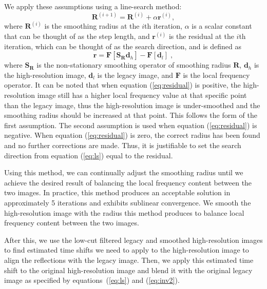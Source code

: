 We apply these assumptions using a line-search method:
    \begin{equation}
        \label{eq:linesearch}
        \mathbf{R}^{(i+1)} = \mathbf{R}^{(i)}+ \alpha \mathbf{r}^{(i)},
    \end{equation}
where $\mathbf{R}^{(i)}$ is the smoothing radius at the $i$th iteration, $\alpha$ is a scalar constant that can be thought of as the step length, and $\mathbf{r}^{(i)}$ is the residual at the $i$th iteration, which can be thought of as the search direction, and is defined as
    \begin{equation}
        \label{eq:residual}
        \mathbf{r} = \mathbf{F}[\mathbf{S}_{\mathbf{R}} \mathbf{d}_h] - \mathbf{F}[\mathbf{d}_l]\;,
    \end{equation}
where $\mathbf{S}_\mathbf{R}$ is the non-stationary smoothing operator of smoothing radius $\mathbf{R}$, $\mathbf{d}_h$ is the high-resolution image, $\mathbf{d}_l$ is the legacy image, and $\mathbf{F}$ is the local frequency operator.
It can be noted that when equation (\ref{eq:residual}) is positive, the high-resolution image still has a higher local frequency value at that specific point than the legacy image, thus the high-resolution image is under-smoothed and the smoothing radius should be increased at that point.
This follows the form of the first assumption.
The second assumption is used when equation (\ref{eq:residual}) is negative.
When equation (\ref{eq:residual}) is zero, the correct radius has been found and no further corrections are made.
Thus, it is justifiable to set the search direction from equation (\ref{eq:ls}) equal to the residual.

Using this method, we can continually adjust the smoothing radius until we achieve the desired result of balancing the local frequency content between the two images.
In practice, this method produces an acceptable solution in approximately 5 iterations and exhibits sublinear convergence.
We smooth the high-resolution image with the radius this method produces to balance local frequency content between the two images.

After this, we use the low-cut filtered legacy and smoothed high-resolution images to find estimated time shifts we need to apply to the high-resolution image to align the reflections with the legacy image.
Then, we apply this estimated time shift to the original high-resolution image and blend it with the original legacy image as specified by equations~(\ref{eq:ls}) and (\ref{eq:inv2}).

